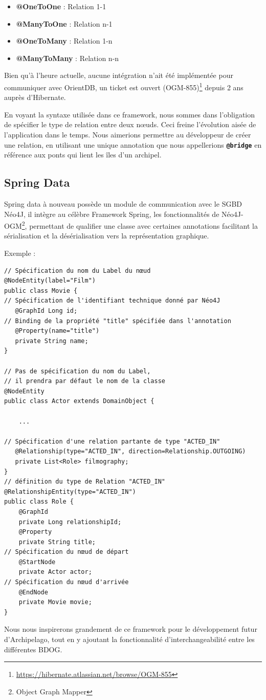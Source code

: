 \documentclass[a4paper,fleqn,12pt,oneside]{report}
\begin{document}
\begin{itemize}
\item \textbf{@OneToOne} : Relation 1-1
\item \textbf{@ManyToOne} : Relation n-1
\item \textbf{@OneToMany} : Relation 1-n
\item \textbf{@ManyToMany} : Relation n-n
\end{itemize}

Bien qu'à l'heure actuelle, aucune intégration n'ait été implémentée pour communiquer avec OrientDB, un ticket est ouvert (OGM-855)\footnote{\url{https://hibernate.atlassian.net/browse/OGM-855}} depuis 2 ans auprès d'Hibernate.

En voyant la syntaxe utilisée dans ce framework, nous sommes dans l'obligation de spécifier le type de relation entre deux nœuds. Ceci freine l'évolution aisée de l'application dans le temps. Nous aimerions permettre au développeur de créer une relation, en utilisant une unique annotation que nous appellerions \textbf{\texttt{@bridge}} en référence aux ponts qui lient les îles d'un archipel. \label{bridge}

\subsection{Spring Data}

Spring data à nouveau possède un module de communication avec le SGBD Néo4J, il intègre au célèbre Framework Spring, les fonctionnalités de Néo4J-OGM\footnote{Object Graph Mapper}, permettant de qualifier une classe avec certaines annotations facilitant la sérialisation et la désérialisation vers la représentation graphique.

Exemple : 

\begin{lstlisting}
// Spécification du nom du Label du nœud
@NodeEntity(label="Film")
public class Movie {
// Spécification de l'identifiant technique donné par Néo4J
   @GraphId Long id;
// Binding de la propriété "title" spécifiée dans l'annotation
   @Property(name="title")
   private String name;
}

// Pas de spécification du nom du Label, 
// il prendra par défaut le nom de la classe
@NodeEntity
public class Actor extends DomainObject {

	... 
	
// Spécification d'une relation partante de type "ACTED_IN"
   @Relationship(type="ACTED_IN", direction=Relationship.OUTGOING)
   private List<Role> filmography;
}
// définition du type de Relation "ACTED_IN" 
@RelationshipEntity(type="ACTED_IN")
public class Role {
    @GraphId   
    private Long relationshipId;
    @Property  
    private String title;
// Spécification du nœud de départ
    @StartNode 
    private Actor actor;
// Spécification du nœud d'arrivée
    @EndNode   
    private Movie movie;
}
\end{lstlisting}
Nous nous inspirerons grandement de ce framework pour le développement futur d'Archipelago, tout en y ajoutant la fonctionnalité d'interchangeabilité entre les différentes BDOG. 
\end{document}
